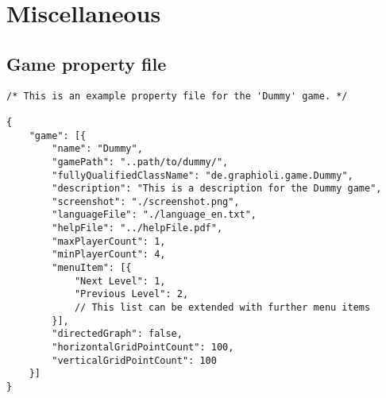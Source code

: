 \section{Miscellaneous}
\subsection{Game property file}

\begin{lstlisting}[caption=An example of a property file]
/* This is an example property file for the 'Dummy' game. */

{
    "game": [{
        "name": "Dummy",
        "gamePath": "..path/to/dummy/",
        "fullyQualifiedClassName": "de.graphioli.game.Dummy",
        "description": "This is a description for the Dummy game",
        "screenshot": "./screenshot.png",
        "languageFile": "./language_en.txt",
        "helpFile": "../helpFile.pdf",
        "maxPlayerCount": 1,
        "minPlayerCount": 4,
        "menuItem": [{
            "Next Level": 1,
            "Previous Level": 2,
            // This list can be extended with further menu items
        }],
        "directedGraph": false,
        "horizontalGridPointCount": 100,
        "verticalGridPointCount": 100
    }]
}
\end{lstlisting}
